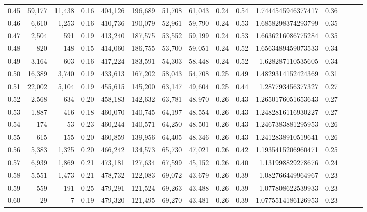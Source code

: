 \begin{tabular}{rrrrrrrrrrrrrrr}
0.45 &  59,177 &  11,438 &  0.16 &  404,126 &  196,689 &   51,708 &   61,043 &  0.24 &  0.54 &    1.7444545946377417 &      0.36 \\
0.46 &   6,610 &   1,253 &  0.16 &  410,736 &  190,079 &   52,961 &   59,790 &  0.24 &  0.53 &    1.6858298374293799 &      0.35 \\
0.47 &   2,504 &     591 &  0.19 &  413,240 &  187,575 &   53,552 &   59,199 &  0.24 &  0.53 &    1.6636216086775284 &      0.35 \\
0.48 &     820 &     148 &  0.15 &  414,060 &  186,755 &   53,700 &   59,051 &  0.24 &  0.52 &    1.6563489459073533 &      0.34 \\
0.49 &   3,164 &     603 &  0.16 &  417,224 &  183,591 &   54,303 &   58,448 &  0.24 &  0.52 &     1.628287110535605 &      0.34 \\
0.50 &  16,389 &   3,740 &  0.19 &  433,613 &  167,202 &   58,043 &   54,708 &  0.25 &  0.49 &    1.4829314152424369 &      0.31 \\
0.51 &  22,002 &   5,104 &  0.19 &  455,615 &  145,200 &   63,147 &   49,604 &  0.25 &  0.44 &     1.287793456377327 &      0.27 \\
0.52 &   2,568 &     634 &  0.20 &  458,183 &  142,632 &   63,781 &   48,970 &  0.26 &  0.43 &    1.2650176051653643 &      0.27 \\
0.53 &   1,887 &     416 &  0.18 &  460,070 &  140,745 &   64,197 &   48,554 &  0.26 &  0.43 &    1.2482816116930227 &      0.27 \\
0.54 &     174 &      53 &  0.23 &  460,244 &  140,571 &   64,250 &   48,501 &  0.26 &  0.43 &    1.2467383881295953 &      0.26 \\
0.55 &     615 &     155 &  0.20 &  460,859 &  139,956 &   64,405 &   48,346 &  0.26 &  0.43 &    1.2412838910519641 &      0.26 \\
0.56 &   5,383 &   1,325 &  0.20 &  466,242 &  134,573 &   65,730 &   47,021 &  0.26 &  0.42 &    1.1935415206960471 &      0.25 \\
0.57 &   6,939 &   1,869 &  0.21 &  473,181 &  127,634 &   67,599 &   45,152 &  0.26 &  0.40 &     1.131998829278676 &      0.24 \\
0.58 &   5,551 &   1,473 &  0.21 &  478,732 &  122,083 &   69,072 &   43,679 &  0.26 &  0.39 &     1.082766449964967 &      0.23 \\
0.59 &     559 &     191 &  0.25 &  479,291 &  121,524 &   69,263 &   43,488 &  0.26 &  0.39 &     1.077808622539933 &      0.23 \\
0.60 &      29 &       7 &  0.19 &  479,320 &  121,495 &   69,270 &   43,481 &  0.26 &  0.39 &    1.0775514186126953 &      0.23 \\

\end{tabular}
